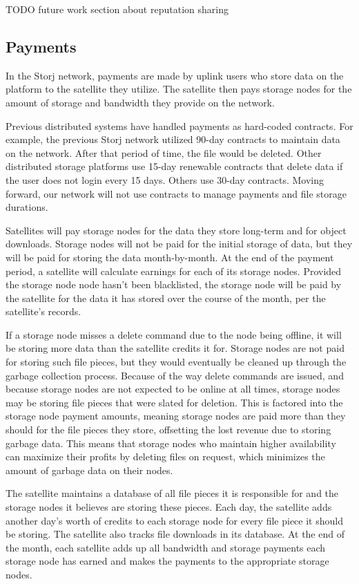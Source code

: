 \documentclass[a4paper,10pt]{article} \usepackage[utf8]{inputenc}
\newcommand{\todo}[1]{{\color{red} TODO #1 }}
\begin{document}
\todo{future work section about reputation sharing}

\subsection{Payments}

In the Storj network, payments are made by uplink users who store data on the
platform to the satellite they utilize.
The satellite then pays storage nodes for the amount of storage and bandwidth
they
provide on the network.

Previous distributed systems have handled payments as hard-coded contracts.
For example, the previous Storj network utilized 90-day contracts to maintain
data on the network. After that period of time, the file would be deleted.
Other distributed storage platforms use 15-day renewable contracts that delete
data if the user does not login every 15 days. Others use 30-day contracts.
Moving forward, our network will not use contracts to manage payments and file
storage durations.

Satellites will pay storage nodes for the data they store long-term
and for object downloads.
Storage nodes will not be paid for the initial storage of data, but they
will be paid for storing the data month-by-month. At the end of the payment
period, a satellite will calculate earnings for each of its storage nodes.
Provided the storage node node hasn’t been blacklisted,
the storage node will be paid by the satellite for the data it has stored
over the course of
the month, per the satellite's records.

If a storage node misses a delete command due to the node being
offline, it will be storing more data than the satellite credits it for.
Storage nodes are not paid for storing such file pieces, but they
would eventually be cleaned up through the garbage collection process.
Because of the
way delete commands are issued, and because storage nodes are not expected to be
online at all times, storage nodes may be storing file pieces that were slated
for
deletion. This is factored into
the storage node payment amounts, meaning storage nodes are paid more than they
should for the file pieces they store, offsetting the lost revenue due to
storing garbage data.
This means that storage nodes who maintain higher availability
can maximize their profits by deleting files on request,
which minimizes the amount
of garbage data on their nodes.

The satellite maintains a database of all file pieces it is responsible for
and the storage nodes it believes are storing these pieces. Each day,
the satellite adds another day’s worth
of credits to each storage node for every file
piece
it should be storing. The satellite
also tracks file downloads in its database.
At the end of the month, each satellite
adds up all bandwidth and storage payments each storage node has earned and
makes
the payments to the appropriate storage nodes.
\end{document}
